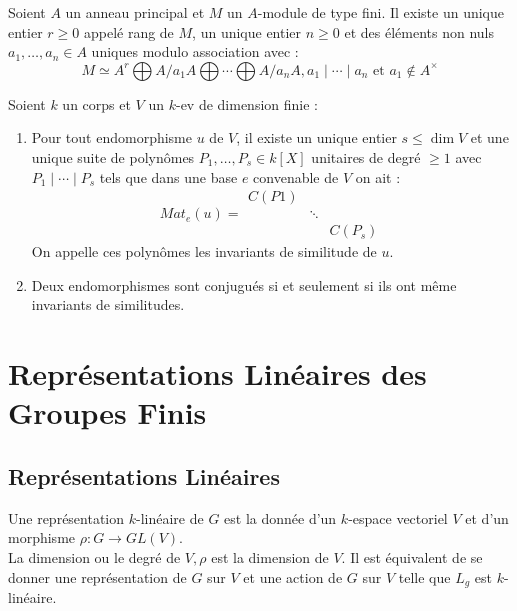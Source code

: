 \documentclass{cours}
\begin{document}
\begin{theorem}
    Soient $A$ un anneau principal et $M$ un $A$-module de type fini. Il existe un unique entier $r \geq 0$ appelé rang de $M$, un unique entier $n \geq 0$ et des éléments non nuls $a_{1}, \ldots, a_{n} \in A$ uniques modulo association avec :
    \[
        M \simeq A^{r} \bigoplus A/a_{1}A \bigoplus \cdots \bigoplus A/a_{n}A, a_{1} \mid \cdots \mid a_{n} \text{ et } a_{1} \notin A^{\times}
    \]
\end{theorem}

\begin{theorem}
    Soient $k$ un corps et $V$ un $k$-ev de dimension finie :
    \begin{enumerate}
        \item Pour tout endomorphisme $u$ de $V$, il existe un unique entier $s \leq \dim V$ et une unique suite de polynômes $P_{1}, \ldots, P_{s} \in k[X]$ unitaires de degré $\geq 1$ avec $P_{1} \mid \cdots \mid P_{s}$ tels que dans une base $e$ convenable de $V$ on ait :
              \[
                  Mat_{e}(u) = \begin{matrix}
                      C(P1) &        &          \\
                            & \ddots &          \\
                            &        & C(P_{s})
                  \end{matrix}
              \]
              On appelle ces polynômes les invariants de similitude de $u$.
        \item Deux endomorphismes sont conjugués si et seulement si ils ont même invariants de similitudes.
    \end{enumerate}
\end{theorem}

\section{Représentations Linéaires des Groupes Finis}
\subsection{Représentations Linéaires}
\begin{definition}
    Une représentation $k$-linéaire de $G$ est la donnée d'un $k$-espace vectoriel $V$ et d'un morphisme $\rho : G \rightarrow GL(V)$.\\
    La dimension ou le degré de $V, \rho$ est la dimension de $V$. Il est équivalent de se donner une représentation de $G$ sur $V$ et une action de $G$ sur $V$ telle que $L_{g}$ est $k$-linéaire.
\end{definition}
\end{document}
